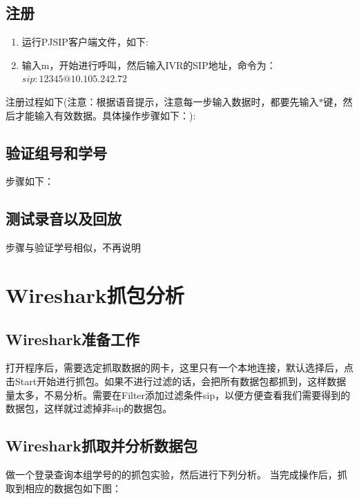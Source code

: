 \documentclass[a4paper,AutoFakeBold,oneside,12pt]{book}
\begin{document}
\subsection{注册}

\begin{enumerate}
\item 运行PJSIP客户端文件，如下:


\item 输入m，开始进行呼叫，然后输入IVR的SIP地址，命令为：$sip:12345@10.105.242.72$
\end{enumerate}

注册过程如下(注意：根据语音提示，注意每一步输入数据时，都要先输入$*$键，然后才能输入有效数据。具体操作步骤如下：):


\subsection{验证组号和学号}
步骤如下：


\subsection{测试录音以及回放}
步骤与验证学号相似，不再说明

\section{Wireshark\cite{wire_shark}抓包分析}
\subsection{Wireshark准备工作}
打开程序后，需要选定抓取数据的网卡，这里只有一个本地连接，默认选择后，点击Start开始进行抓包。如果不进行过滤的话，会把所有数据包都抓到，这样数据量太多，不易分析。需要在Filter添加过滤条件sip，以便方便查看我们需要得到的数据包，这样就过滤掉非sip的数据包。
\subsection{Wireshark抓取并分析数据包}
做一个登录查询本组学号的的抓包实验，然后进行下列分析。
当完成操作后，抓取到相应的数据包如下图：

\end{document}
